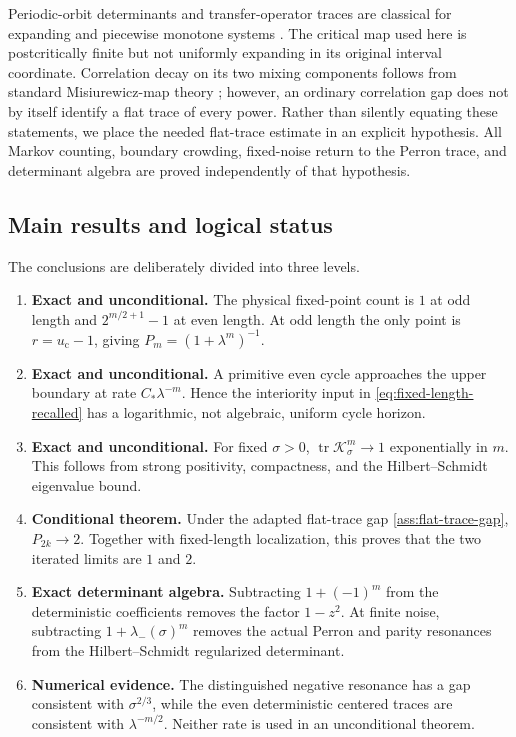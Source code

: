 \documentclass[11pt]{article}
\theoremstyle{definition}
\theoremstyle{remark}
\newcommand{\uc}{u_{\mathrm c}}
\newcommand{\cK}{\mathcal K}
\newcommand{\tr}{\operatorname{tr}}
\begin{document}
Periodic-orbit determinants and transfer-operator traces are classical for
expanding and piecewise monotone systems
\citep{Ruelle1976,BaladiKeller1990,Baladi2000,Baladi2018}.  The critical map
used here is postcritically finite but not uniformly expanding in its original
interval coordinate.  Correlation decay on its two mixing components follows
from standard Misiurewicz-map theory
\citep{Misiurewicz1981,Young1992,deMeloVanStrien1993}; however, an ordinary
correlation gap does not by itself identify a flat trace of every power.
Rather than silently equating these statements, we place the needed
flat-trace estimate in an explicit hypothesis.  All Markov counting, boundary
crowding, fixed-noise return to the Perron trace, and determinant algebra are
proved independently of that hypothesis.

\subsection*{Main results and logical status}

The conclusions are deliberately divided into three levels.
\begin{enumerate}[label=\textbf{R\arabic*.},leftmargin=3.2em]
 \item \textbf{Exact and unconditional.}  The physical fixed-point count is
 $1$ at odd length and $2^{m/2+1}-1$ at even length.  At odd length the only
 point is $r=\uc-1$, giving $P_m=(1+\lambda^m)^{-1}$.

 \item \textbf{Exact and unconditional.}  A primitive even cycle approaches
 the upper boundary at rate $C_*\lambda^{-m}$.  Hence the interiority input in
 \eqref{eq:fixed-length-recalled} has a logarithmic, not algebraic, uniform
 cycle horizon.

 \item \textbf{Exact and unconditional.}  For fixed $\sigma>0$,
 $\tr\cK_\sigma^m\to1$ exponentially in $m$.  This follows from strong
 positivity, compactness, and the Hilbert--Schmidt eigenvalue bound.

 \item \textbf{Conditional theorem.}  Under the adapted flat-trace gap
 \cref{ass:flat-trace-gap}, $P_{2k}\to2$.  Together with fixed-length
 localization, this proves that the two iterated limits are $1$ and $2$.

 \item \textbf{Exact determinant algebra.}  Subtracting $1+(-1)^m$ from the
 deterministic coefficients removes the factor $1-z^2$.  At finite noise,
 subtracting $1+\lambda_-(\sigma)^m$ removes the actual Perron and parity
 resonances from the Hilbert--Schmidt regularized determinant.

 \item \textbf{Numerical evidence.}  The distinguished negative resonance
 has a gap consistent with $\sigma^{2/3}$, while the even deterministic
 centered traces are consistent with $\lambda^{-m/2}$.  Neither rate is used
 in an unconditional theorem.
\end{enumerate}
\end{document}
